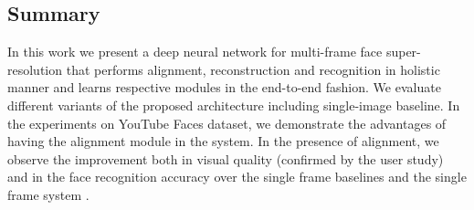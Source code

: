 \subsection{Summary}
\label{sec:summary}
In this work we present a deep neural network for multi-frame face super-resolution that performs alignment, reconstruction and recognition in holistic manner and learns respective modules in the end-to-end fashion. We evaluate different variants of the proposed architecture including single-image baseline. In the experiments on YouTube Faces dataset, we demonstrate the advantages of having the alignment module in the system. In the presence of alignment, we observe the improvement both in visual quality (confirmed by the user study) and in the face recognition accuracy over the single frame baselines and the single frame system \cite{ZhuLLT16}. 
